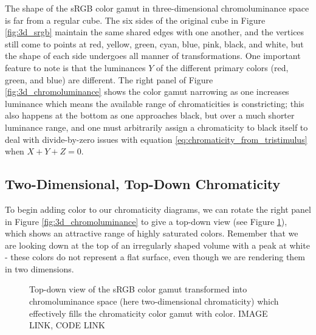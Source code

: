 \documentclass[twocolumn]{article}
\newif\ifinvert
\begin{document}
The shape of the sRGB color gamut in three-dimensional chromoluminance space is far from a regular cube.  The six sides of the original cube in Figure \ref{fig:3d_srgb} maintain the same shared edges with one another, and the vertices still come to points at red, yellow, green, cyan, blue, pink, black, and white, but the shape of each side undergoes all manner of transformations.  One important feature to note is that the luminances $Y$ of the different primary colors (red, green, and blue) are different.  The right panel of Figure \ref{fig:3d_chromoluminance} shows the color gamut narrowing as one increases luminance which means the available range of chromaticities is constricting; this also happens at the bottom as one approaches black, but over a much shorter luminance range, and one must arbitrarily assign a chromaticity to black itself to deal with divide-by-zero issues with equation \ref{eq:chromaticity_from_tristimulus} when $X+Y+Z=0$.
\subsection{Two-Dimensional, Top-Down Chromaticity}
To begin adding color to our chromaticity diagrams, we can rotate the right panel in Figure \ref{fig:3d_chromoluminance} to give a top-down view (see Figure \ref{fig:chromaticity_inside_gamut}), which shows an attractive range of highly saturated colors.  Remember that we are looking down at the top of an irregularly shaped volume with a peak at white - these colors do not represent a flat surface, even though we are rendering them in two dimensions.
\begin{figure}[h]
    \ifinvert
        
    \else
        
    \fi
    \caption{Top-down view of the sRGB color gamut transformed into chromoluminance space (here two-dimensional chromaticity) which effectively fills the chromaticity color gamut with color.  IMAGE LINK, CODE LINK}\label{fig:chromaticity_inside_gamut}
\end{figure}
\end{document}
